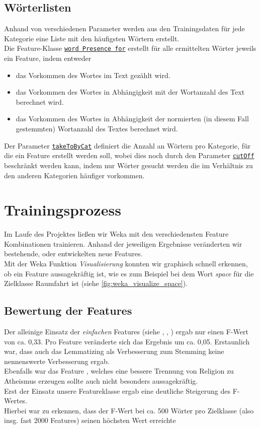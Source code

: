 \documentclass[
	11pt,
	a4paper
]{scrartcl}
\newcommand{\code}[1]{\texttt{\ul{#1}}}
\begin{document}
\subsection{Wörterlisten}\label{woerterlisten}
Anhand von verschiedenen Parameter werden aus den Trainingsdaten für jede Kategorie eine Liste mit den häufigsten Wörtern erstellt.\\
Die Feature-Klasse \code{word Presence for} erstellt für alle ermittelten Wörter jeweils ein Feature, indem entweder
\begin{itemize}[itemsep=0pt,parsep=0pt]
	\item das Vorkommen des Wortes im Text gezählt wird.
	\item das Vorkommen des Wortes in Abhängigkeit mit der Wortanzahl des Text berechnet wird.
	\item das Vorkommen des Wortes in Abhängigkeit der normierten (in diesem Fall gestemmten) Wortanzahl des Textes berechnet wird.
\end{itemize}

Der Parameter \code{takeToByCat} definiert die Anzahl an Wörtern pro Kategorie, für die ein Feature erstellt werden soll, wobei dies noch
durch den Parameter \code{cutOff} beschränkt werden kann, indem nur Wörter gesucht werden die im Verhältnis zu den anderen Kategorien 
häufiger vorkommen.


\section{Trainingsprozess}\label{trainingsprozess}
Im Laufe des Projektes ließen wir Weka mit den verschiedensten Feature Kombinationen trainieren. Anhand der jeweiligen Ergebnisse
veränderten wir bestehende, oder entwickelten neue Features.\\
Mit der Weka Funktion \emph{Visualisierung} konnten wir graphisch schnell erkennen, ob ein Feature aussagekräftig ist, wie es zum
Beispiel bei dem Wort \emph{space} für die Zielklasse Raumfahrt ist (siehe \autoref{fig:weka_visualize_space}).

\subsection{Bewertung der Features}
Der alleinige Einsatz der \emph{einfachen} Features (siehe \emph{}, \emph{},
\emph{}) ergab nur einen F-Wert von ca. 0,33. Pro Feature veränderte sich das Ergebnis um ca. 0,05. Erstaunlich
war, dass auch das Lemmatizing als Verbesserung zum Stemming keine nennenswerte Verbesserung ergab.\\
Ebenfalls war das Feature \emph{}, welches eine bessere Trennung von Religion zu Atheismus erzeugen sollte auch nicht
besonders aussagekräftig.\\
Erst der Einsatz unsere Featureklasse \emph{} ergab eine deutliche Steigerung des F-Wertes.\\
Hierbei war zu erkennen, dass der F-Wert bei ca. 500 Wörter pro Zielklasse (also insg. fast 2000 Features) seinen höchsten Wert erreichte\\
\end{document}
